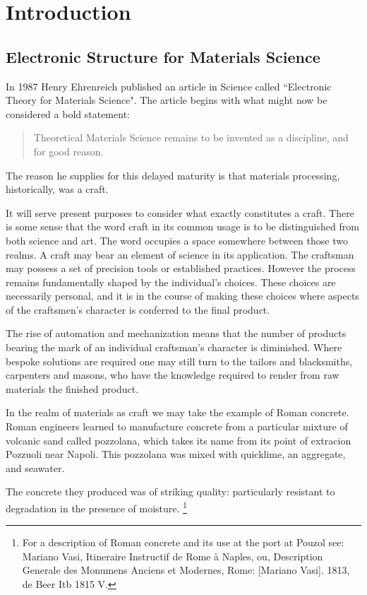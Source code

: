 \chapter{Introduction}
\section{Electronic Structure for Materials Science}
In 1987 Henry Ehrenreich published an article in Science called
``Electronic Theory for Materials Science". The article begins
with what might now be considered a bold statement:

\begin{quote}
Theoretical Materials Science remains to be invented as a discipline, and for good reason.
\end{quote}

The reason he supplies for this delayed maturity is that materials processing, 
historically, was a craft.

It will serve present purposes to consider what exactly constitutes a craft. 
There is some sense that the word craft in its common usage 
is to be distinguished from both science and art.
The word occupies a space somewhere between those two realms. 
A craft may bear an element of science in its application. 
The craftsman may possess a set of precision tools or 
established practices. However the process remains fundamentally shaped by 
the individual's choices. These choices are necessarily personal,
and it is in the course of making these choices where aspects 
of the craftsmen's character is conferred to the final product. 

The rise of automation and mechanization means that the 
number of products bearing the mark of an individual craftsman's 
character is diminished. Where bespoke solutions are 
required one may still turn to the tailors and blacksmiths, 
carpenters and masons, who have the knowledge 
required to render from raw materials the finished product.


In the realm of materials as craft we may take the example of Roman concrete.
%
Roman engineers learned to manufacture concrete from a 
particular mixture of volcanic sand called pozzolana, which
takes its name from its point of extracion Pozzuoli near Napoli. 
%
This pozzolana was mixed with quicklime, an aggregate, and seawater.

The concrete they produced was of striking quality: 
particularly resistant to degradation in the presence of moisture.
%
%
\footnote{For a description of Roman concrete and its use at the port at Pouzol see: Mariano Vasi, 
Itineraire Instructif de Rome à Naples, ou, Description Generale des Monumens Anciens et Modernes, 
Rome: [Mariano Vasi]. 1813, de Beer Itb 1815 V.} 

